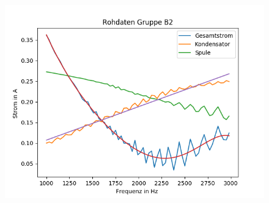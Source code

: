 \documentclass[12pt,a4paper]{article}
\begin{document}
\begin{figure}[H]
\includegraphics[scale=0.65]{Bilder/Parallel_RohdatenB_2.png}
\end{figure}
\end{document}

